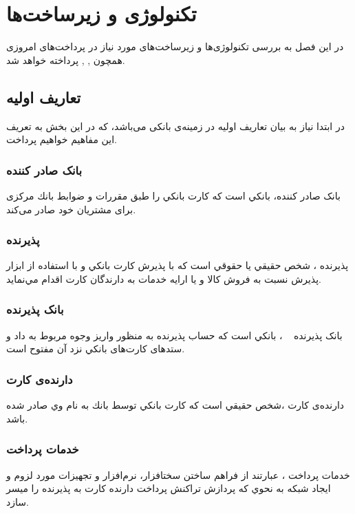 \documentclass[oneside]{report}
\begin{document}
		
		\chapter{تکنولوژی {\Large{}} و زیرساخت‌ها }\label{tokenisation}
	در این فصل به بررسی تکنولوژی‌ها و زیرساخت‌های  مورد نیاز در پرداخت‌های امروزی همچون 
	   		 {\normalsize{}} , 
	    		 {\normalsize{}} , 
	    		    		 {\normalsize{}} 
	پرداخته خواهد شد.
	
	\noindent

		
	\section{تعاریف اولیه}\label{definitions}
			در ابتدا نیاز به بیان تعاریف اولیه‌ در زمینه‌ی بانکی می‌باشد، که در این بخش به تعریف این مفاهیم خواهیم پرداخت. 
\subsection{بانک صادر کننده}			
		بانک صادر کننده،   بانكي است كه كارت بانكي را طبق مقررات و ضوابط بانك مركزی برای مشتريان خود صادر
می‌كند.
\subsection{پذیرنده}
پذیرنده ،   شخص حقيقي يا حقوقي است كه با پذيرش كارت بانكي و با استفاده از ابزار پذيرش نسبت به
فروش كالا و يا ارايه خدمات به دارندگان كارت اقدام مي‌نمايد.  			 				
	  			 				
\subsection{بانک پذیرنده}
بانک پذیرنده 
	، بانكي است كه حساب پذيرنده به منظور واريز وجوه مربوط به داد و ستدهای كارت‌های‌		بانكي نزد آن مفتوح است. 
		
\subsection{دارنده‌ی کارت}		
		دارنده‌ی کارت 
	  			 				،شخص حقيقي است كه كارت بانكي توسط بانك به نام وي صادر شده باشد.			 		
\subsection{خدمات پرداخت}
خدمات پرداخت 		
			  			 				، عبارتند از فراهم ساختن سختافزار، نرم‌افزار و تجهيزات مورد لزوم و ايجاد شبكه به نحوي كه
پردازش تراكنش پرداخت دارنده كارت به پذيرنده را ميسر سازد. 
\end{document}
